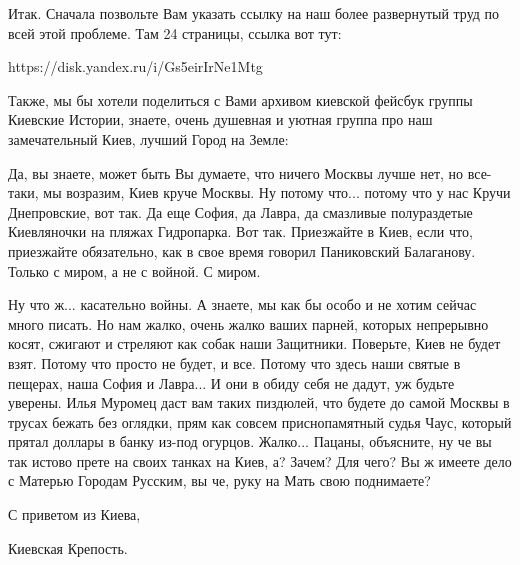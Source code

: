 Итак. Сначала позвольте Вам указать ссылку на наш более развернутый труд по
всей этой проблеме. Там 24 страницы, ссылка вот тут:

https://disk.yandex.ru/i/Gs5eirIrNe1Mtg

Также, мы бы хотели поделиться с Вами архивом киевской фейсбук группы Киевские Истории,
знаете, очень душевная и уютная группа про наш замечательный Киев, лучший Город на Земле:

Да, вы знаете, может быть Вы думаете, что ничего Москвы лучше нет, но все-таки,
мы возразим, Киев круче Москвы. Ну потому что... потому что у нас Кручи
Днепровские, вот так. Да еще София, да Лавра, да смазливые полураздетые
Киевляночки на пляжах Гидропарка. Вот так. Приезжайте в Киев, если что,
приезжайте обязательно, как в свое время говорил Паниковский Балаганову. Только
с миром, а не с войной. С миром.

Ну что ж... касательно войны. А знаете, мы как бы особо и не хотим сейчас много
писать.  Но нам жалко, очень жалко ваших парней, которых непрерывно косят,
сжигают и стреляют как собак наши Защитники. Поверьте, Киев не будет взят.
Потому что просто не будет, и все.  Потому что здесь наши святые в пещерах,
наша София и Лавра... И они в обиду себя не дадут, уж будьте уверены.  Илья
Муромец даст вам таких пиздюлей, что будете до самой Москвы в трусах бежать без
оглядки, прям как совсем приснопамятный судья Чаус, который прятал доллары в
банку из-под огурцов.  Жалко... Пацаны, объясните, ну че вы так истово прете на
своих танках на Киев, а?  Зачем? Для чего? Вы ж имеете дело с Матерью Городам
Русским, вы че, руку на Мать свою поднимаете? 

С приветом из Киева,

Киевская Крепость.




